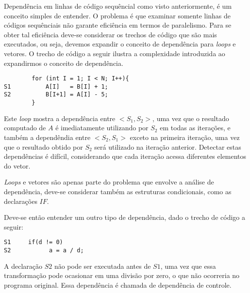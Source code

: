 Dependência em linhas de código sequêncial como visto anteriormente, é um
conceito simples de entender.
O problema é que examinar somente linhas de códigos sequênciais não garante 
eficiência em termos de paralelismo. 
Para se obter tal eficiência deve-se considerar os trechos de
código que são mais executados, ou seja, devemos expandir o conceito de
dependência para \textit{loops} e vetores.
O trecho de código a seguir ilustra a complexidade introduzida ao expandirmos o
conceito de dependência.

\begin{verbatim}
        for (int I = 1; I < N; I++){
S1          A[I]   = B[I] + 1;
S2          B[I+1] = A[I] - 5;
        }
\end{verbatim}

Este \textit{loop} mostra a dependência entre $<S_1,S_2>$, uma vez que o
resultado computado de $A$ é imediatamente utilizando por $S_2$ em todas as
iterações, e também a dependêndia entre $<S_2,S_1>$ exceto na primeira iteração,
uma vez que o resultado obtido por $S_2$ será utilizado na iteração anterior.
Detectar estas dependências é difícil, considerando que cada iteração acessa 
diferentes elementos do vetor.

\textit{Loops} e vetores são apenas parte do problema que envolve a análise de
dependência, deve-se considerar também as estruturas condicionais, como as
declarações $IF$.

Deve-se então entender um outro tipo de dependência, dado o trecho de
código a seguir:

\begin{verbatim}
S1     if(d != 0)
S2           a = a / d;
\end{verbatim}

A declaração $S2$ não pode ser executada antes de $S1$, uma vez que essa
transformação pode ocasionar em uma divisão por zero, o que não ocorreria no
programa original. Essa dependência é chamada de dependência de controle.




